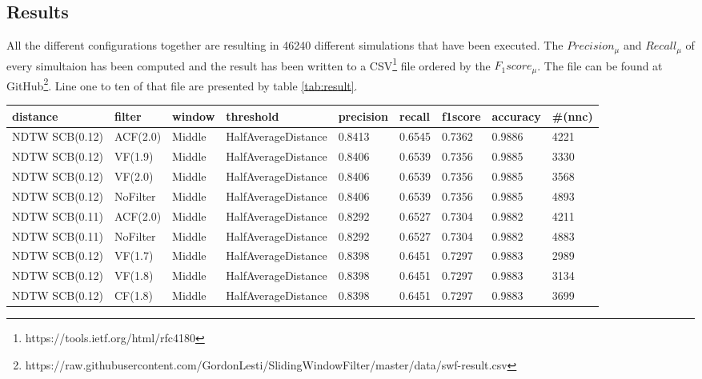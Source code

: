 \subsection{Results} \label{results}
All the different configurations together are resulting in 46240 different simulations that have been executed. The
$Precision_{\mu}$ and $Recall_{\mu}$ of every simultaion has been computed and the result has been written to a
CSV\footnote{https://tools.ietf.org/html/rfc4180} file ordered by the $F_{1}score_{\mu}$. The file can be found at
GitHub\footnote{https://raw.githubusercontent.com/GordonLesti/SlidingWindowFilter/master/data/swf-result.csv}. Line one
to ten of that file are presented by table \ref{tab:result}.

\begin{table}[H]
    \begin{center}
        {\tiny
            \begin{tabular}{l l l l l l l l l}
                \textbf{distance} & \textbf{filter} & \textbf{window} & \textbf{threshold} & \textbf{precision} & \textbf{recall} & \textbf{f1score} & \textbf{accuracy} & \textbf{\#(nnc)}\\
                \hline
                NDTW SCB(0.12) & ACF(2.0) & Middle  & HalfAverageDistance & 0.8413 & 0.6545 & 0.7362 & 0.9886 & 4221\\
                NDTW SCB(0.12) & VF(1.9) & Middle  & HalfAverageDistance & 0.8406 & 0.6539 & 0.7356 & 0.9885 & 3330\\
                NDTW SCB(0.12) & VF(2.0) & Middle  & HalfAverageDistance & 0.8406 & 0.6539 & 0.7356 & 0.9885 & 3568\\
                NDTW SCB(0.12) & NoFilter & Middle  & HalfAverageDistance & 0.8406 & 0.6539 & 0.7356 & 0.9885 & 4893\\
                NDTW SCB(0.11) & ACF(2.0) & Middle  & HalfAverageDistance & 0.8292 & 0.6527 & 0.7304 & 0.9882 & 4211\\
                NDTW SCB(0.11) & NoFilter & Middle & HalfAverageDistance & 0.8292 & 0.6527 & 0.7304 & 0.9882 & 4883\\
                NDTW SCB(0.12) & VF(1.7) & Middle & HalfAverageDistance & 0.8398 & 0.6451 & 0.7297 & 0.9883 & 2989\\
                NDTW SCB(0.12) & VF(1.8) & Middle & HalfAverageDistance & 0.8398 & 0.6451 & 0.7297 & 0.9883 & 3134\\
                NDTW SCB(0.12) & CF(1.8) & Middle & HalfAverageDistance & 0.8398 & 0.6451 & 0.7297 & 0.9883 & 3699\\

\end{tabular}}
\end{center}
\end{table}
